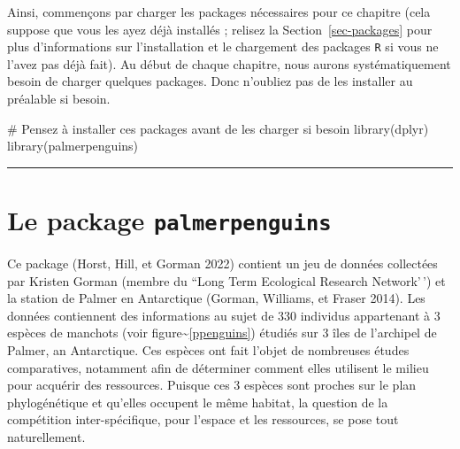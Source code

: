 \documentclass[
  letterpaper,
  DIV=11,
  numbers=noendperiod]{scrreprt}
\newenvironment{Shaded}{\begin{snugshade}}{\end{snugshade}}
\newcommand{\CommentTok}[1]{\textcolor[rgb]{0.37,0.37,0.37}{#1}}
\newcommand{\FunctionTok}[1]{\textcolor[rgb]{0.28,0.35,0.67}{#1}}
\newcommand{\NormalTok}[1]{\textcolor[rgb]{0.00,0.23,0.31}{#1}}
\begin{document}
Ainsi, commençons par charger les packages nécessaires pour ce chapitre
(cela suppose que vous les ayez déjà installés ; relisez la
Section~\ref{sec-packages} pour plus d'informations sur l'installation
et le chargement des packages \texttt{R} si vous ne l'avez pas déjà
fait). Au début de chaque chapitre, nous aurons systématiquement besoin
de charger quelques packages. Donc n'oubliez pas de les installer au
préalable si besoin.

\begin{Shaded}
\begin{Highlighting}[]
\CommentTok{\# Pensez à installer ces packages avant de les charger si besoin }
\FunctionTok{library}\NormalTok{(dplyr)}
\FunctionTok{library}\NormalTok{(palmerpenguins)}
\end{Highlighting}
\end{Shaded}

\begin{center}\rule{0.5\linewidth}{0.5pt}\end{center}

\hypertarget{le-package-palmerpenguins}{%
\section{\texorpdfstring{Le package
\texttt{palmerpenguins}}{Le package palmerpenguins}}\label{le-package-palmerpenguins}}

Ce package (Horst, Hill, et Gorman 2022) contient un jeu de données
collectées par Kristen Gorman (membre du ``Long Term Ecological Research
Network'\,') et la station de Palmer en Antarctique (Gorman, Williams,
et Fraser 2014). Les données contiennent des informations au sujet de
330 individus appartenant à 3 espèces de manchots (voir
figure\textasciitilde{}\ref{ppenguins}) étudiés sur 3 îles de l'archipel
de Palmer, an Antarctique. Ces espèces ont fait l'objet de nombreuses
études comparatives, notamment afin de déterminer comment elles
utilisent le milieu pour acquérir des ressources. Puisque ces 3 espèces
sont proches sur le plan phylogénétique et qu'elles occupent le même
habitat, la question de la compétition inter-spécifique, pour l'espace
et les ressources, se pose tout naturellement.
\end{document}
